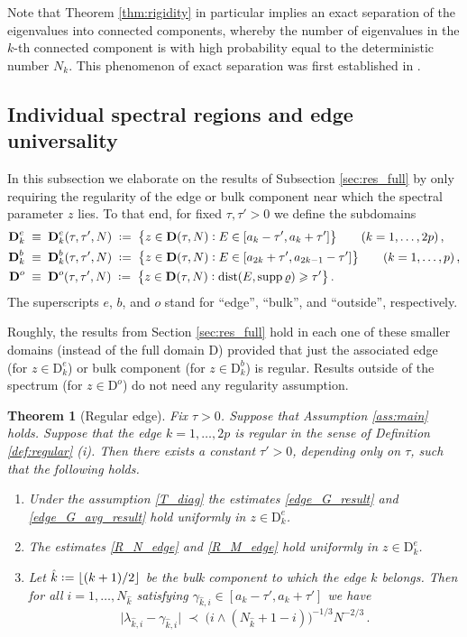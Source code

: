 \documentclass[11pt]{article} %
\numberwithin{equation}{section}
\numberwithin{figure}{section}
\theoremstyle{plain} %
\newtheorem{theorem}{Theorem}[section]
\theoremstyle{definition} %
\newcommand{\f}[1]{\boldsymbol{\mathrm{#1}}} %
\newcommand{\col}{\mathrel{\vcenter{\baselineskip0.75ex \lineskiplimit0pt \hbox{.}\hbox{.}}}}
\newcommand*{\deq}{\mathrel{\vcenter{\baselineskip0.65ex \lineskiplimit0pt \hbox{.}\hbox{.}}}=}
\renewcommand{\geq}{\geqslant}
\newcommand{\floor}[1] {\lfloor {#1} \rfloor}
\newcommand{\pb}[1]{\bigl({#1}\bigr)}
\newcommand{\hb}[1]{\bigl\{{#1}\bigr\}}
\newcommand{\abs}[1]{\lvert #1 \rvert}
\DeclareMathOperator{\supp}{supp}
\DeclareMathOperator{\dist}{dist}
\begin{document}
Note that Theorem \ref{thm:rigidity} in particular implies an exact separation of the eigenvalues into connected components, whereby the number of eigenvalues in the $k$-th connected component is with high probability equal to the deterministic number $N_k$. This phenomenon of exact separation was first established in \cite{BS2, BS3}.




\subsection{Individual spectral regions and edge universality} \label{sec:res_detail}
In this subsection we elaborate on the results of Subsection \ref{sec:res_full} by only requiring the regularity of the edge or bulk component near which the spectral parameter $z$ lies. To that end, for fixed $\tau ,\tau' > 0$ we define the subdomains
\begin{align*}
\f D^e_k &\;\equiv\; \f D^e_k(\tau, \tau', N) \;\deq\; \hb{z \in \f D(\tau, N) \col E \in [a_k - \tau', a_k + \tau'] } \qquad (k = 1, \dots, 2p)\,,
\\
\f D^b_k &\;\equiv\; \f D^b_k(\tau, \tau', N) \;\deq\; \hb{z \in \f D(\tau, N) \col E \in [a_{2k} + \tau', a_{2k - 1} - \tau']} \qquad (k = 1, \dots, p)\,,
\\
\f D^o &\;\equiv\; \f D^o(\tau, \tau', N) \;\deq\; \hb{z \in \f D(\tau, N) \col \dist(E, \supp \varrho) \geq \tau'}\,.
\end{align*}
The superscripts $e$, $b$, and $o$ stand for ``edge'', ``bulk'', and ``outside'', respectively.

Roughly, the results from Section \ref{sec:res_full} hold in each one of these smaller domains (instead of the full domain $\f D$) provided that just the associated edge (for $z \in \f D^e_k$) or bulk component (for $z \in \f D^b_k$) is regular. Results outside of the spectrum (for $z \in \f D^o$) do not need any regularity assumption.

\begin{theorem}[Regular edge] \label{thm:edge}
Fix $\tau > 0$. Suppose that Assumption \ref{ass:main} holds. Suppose that the edge $k = 1, \dots, 2p$ is regular in the sense of Definition \ref{def:regular} (i). Then there exists a constant $\tau' > 0$, depending only on $\tau$, such that the following holds.
\begin{enumerate}
\item
Under the assumption \eqref{T_diag} the estimates \eqref{edge_G_result} and \eqref{edge_G_avg_result} hold uniformly in $z \in \f D^e_k$.
\item
The estimates \eqref{R_N_edge} and \eqref{R_M_edge} hold uniformly in $z \in \f D^e_k$.
\item
Let $\hat k \deq \floor{(k+1)/2}$ be the bulk component to which the edge $k$ belongs. Then for all $i = 1, \dots, N_{\hat k}$ satisfying $\gamma_{\hat k, i} \in [a_k - \tau', a_k + \tau']$ we have
\begin{equation*}
\abs{\lambda_{\hat k,i} - \gamma_{\hat k,i}} \;\prec\; \pb{i \wedge (N_{\hat k} + 1 - i)}^{-1/3} N^{-2/3}\,.
\end{equation*}
\end{enumerate}
\end{theorem}
\end{document}
